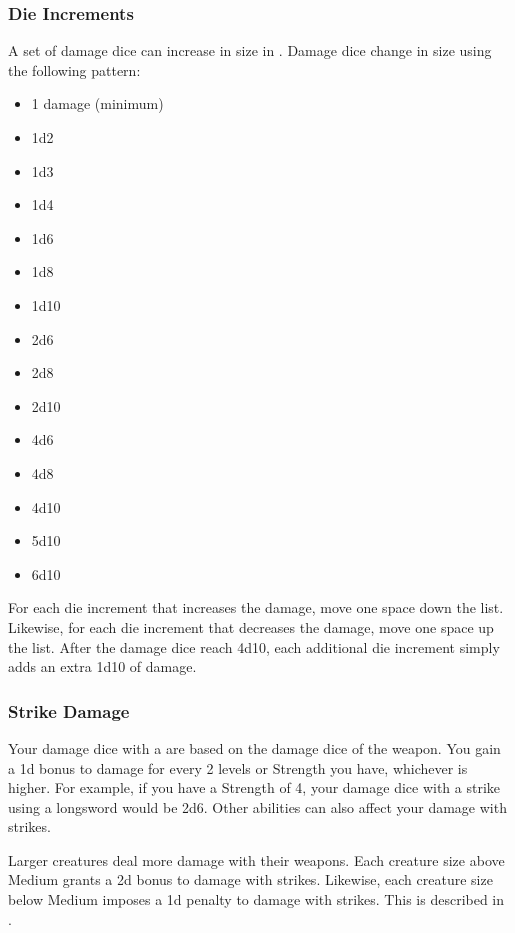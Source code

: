         \subsubsection{Die Increments}\label{Die Increments}
            A set of damage dice can increase in size in .
            Damage dice change in size using the following pattern:
            \begin{itemize}
                \item 1 damage (minimum)
                \item 1d2
                \item 1d3
                \item 1d4
                \item 1d6
                \item 1d8
                \item 1d10
                \item 2d6
                \item 2d8
                \item 2d10
                \item 4d6
                \item 4d8
                \item 4d10
                \item 5d10
                \item 6d10
            \end{itemize}

            For each die increment that increases the damage, move one space down the list.
            Likewise, for each die increment that decreases the damage, move one space up the list.
            After the damage dice reach 4d10, each additional die increment simply adds an extra 1d10 of damage.

        \subsubsection{Strike Damage}\label{Strike Damage}
            Your damage dice with a  are based on the damage dice of the weapon.
            You gain a \plus1d bonus to damage for every 2 levels or Strength you have, whichever is higher.
            For example, if you have a Strength of 4, your damage dice with a strike using a longsword would be 2d6.
            Other abilities can also affect your damage with strikes.

            \label{Creature Size and Damage}
            Larger creatures deal more damage with their weapons.
            Each creature size above Medium grants a \plus2d bonus to damage with strikes.
            Likewise, each creature size below Medium imposes a \minus1d penalty to damage with strikes.
            This is described in .

